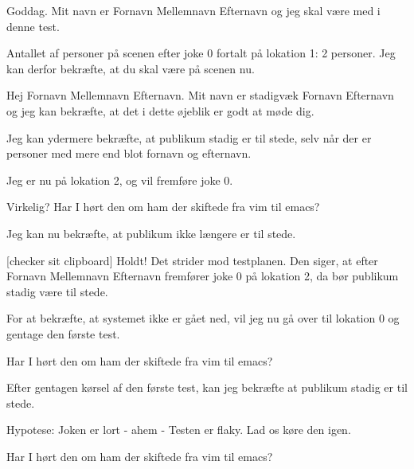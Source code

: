 \documentclass[a4paper,11pt]{article}
\begin{document}
\begin{sketch}
 Goddag. Mit navn er Fornavn Mellemnavn Efternavn og jeg skal være med i denne test.

 Antallet af personer på scenen efter joke 0 fortalt på lokation 1: 2 personer. Jeg kan derfor bekræfte, at du skal være på scenen nu.

 Hej Fornavn Mellemnavn Efternavn. Mit navn er stadigvæk Fornavn Efternavn og jeg kan bekræfte, at det i dette øjeblik er godt at møde dig.


 Jeg kan ydermere bekræfte, at publikum stadig er til stede, selv når der er personer med mere end blot fornavn og efternavn.


 Jeg er nu på lokation 2, og vil fremføre joke 0.

 Virkelig?
 Har I hørt den om ham der skiftede fra vim til emacs?


 Jeg kan nu bekræfte, at publikum ikke længere er til stede.

[checker sit clipboard] Holdt! Det strider mod testplanen. Den siger, at efter Fornavn Mellemnavn Efternavn fremfører joke 0 på lokation 2, da bør publikum stadig være til stede.

 For at bekræfte, at systemet ikke er gået ned, vil jeg nu gå over til lokation 0 og gentage den første test.

 Har I hørt den om ham der skiftede fra vim til emacs?

 Efter gentagen kørsel af den første test, kan jeg bekræfte at publikum stadig er til stede.

 Hypotese: Joken er lort - ahem - Testen er flaky. Lad os køre den igen.

 Har I hørt den om ham der skiftede fra vim til emacs?


\end{sketch}
\end{document}
